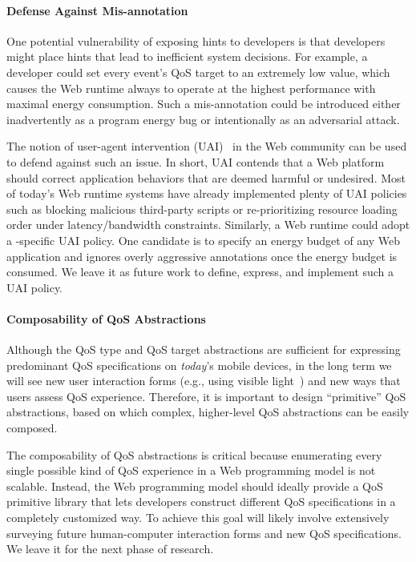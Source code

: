 \paragraph{Defense Against Mis-annotation} One potential vulnerability of exposing \greenweb hints to developers is that developers might place hints that lead to inefficient system decisions. For example, a developer could set every event's QoS target to an extremely low value, which causes the Web runtime always to operate at the highest performance with maximal energy consumption. Such a mis-annotation could be introduced either inadvertently as a program energy bug or intentionally as an adversarial attack.

The notion of user-agent intervention (UAI)~\cite{useragentintervention} in the Web community can be used to defend against such an issue. In short, UAI contends that a Web platform should correct application behaviors that are deemed harmful or undesired. Most of today's Web runtime systems have already implemented plenty of UAI policies such as blocking malicious third-party scripts or re-prioritizing resource loading order under latency/bandwidth constraints. Similarly, a Web runtime could adopt a \greenweb-specific UAI policy. One candidate is to specify an energy budget of any Web application and ignores overly aggressive \greenweb annotations once the energy budget is consumed. We leave it as future work to define, express, and implement such a UAI policy.

\paragraph{Composability of QoS Abstractions} Although the QoS type and QoS target abstractions are sufficient for expressing predominant QoS specifications on \textit{today}'s mobile devices, in the long term we will see new user interaction forms (e.g., using visible light~\cite{license}) and new ways that users assess QoS experience. Therefore, it is important to design ``primitive'' QoS abstractions, based on which complex, higher-level QoS abstractions can be easily composed.

The composability of QoS abstractions is critical because enumerating every single possible kind of QoS experience in a Web programming model is not scalable. Instead, the Web programming model should ideally provide a QoS primitive library that lets developers construct different QoS specifications in a completely customized way. To achieve this goal will likely involve extensively surveying future human-computer interaction forms and new QoS specifications. We leave it for the next phase of research.

